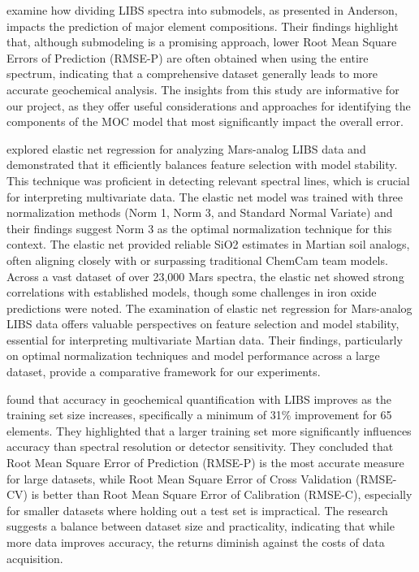 \citeauthor{lepore_quantitative_2022} \cite{lepore_quantitative_2022} examine how dividing LIBS spectra into submodels, as presented in Anderson, impacts the prediction of major element compositions.
Their findings highlight that, although submodeling is a promising approach, lower Root Mean Square Errors of Prediction (RMSE-P) are often obtained when using the entire spectrum, indicating that a comprehensive dataset generally leads to more accurate geochemical analysis.
The insights from this study are informative for our project, as they offer useful considerations and approaches for identifying the components of the MOC model that most significantly impact the overall error.

\citeauthor{bai_application_2023} \cite{bai_application_2023} explored elastic net regression for analyzing Mars-analog LIBS data and demonstrated that it efficiently balances feature selection with model stability.
This technique was proficient in detecting relevant spectral lines, which is crucial for interpreting multivariate data.
The elastic net model was trained with three normalization methods (Norm 1, Norm 3, and Standard Normal Variate) and their findings suggest Norm 3 as the optimal normalization technique for this context.
The elastic net provided reliable SiO2 estimates in Martian soil analogs, often aligning closely with or surpassing traditional ChemCam team models.
Across a vast dataset of over 23,000 Mars spectra, the elastic net showed strong correlations with established models, though some challenges in iron oxide predictions were noted.\cite{bai_application_2023}
The examination of elastic net regression for Mars-analog LIBS data offers valuable perspectives on feature selection and model stability, essential for interpreting multivariate Martian data. Their findings, particularly on optimal normalization techniques and model performance across a large dataset, provide a comparative framework for our experiments.


\citeauthor{dyar_effect_2021} \cite{dyar_effect_2021} found that accuracy in geochemical quantification with LIBS improves as the training set size increases, specifically a minimum of 31\% improvement for 65 elements.
They highlighted that a larger training set more significantly influences accuracy than spectral resolution or detector sensitivity.
They concluded that Root Mean Square Error of Prediction (RMSE-P) is the most accurate measure for large datasets, while Root Mean Square Error of Cross Validation  (RMSE-CV) is better than Root Mean Square Error of Calibration (RMSE-C), especially for smaller datasets where holding out a test set is impractical.
The research suggests a balance between dataset size and practicality, indicating that while more data improves accuracy, the returns diminish against the costs of data acquisition.

